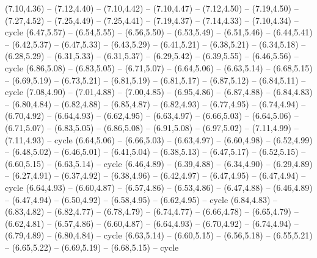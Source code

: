 \expandafter\def\csname geo:gebiet:SYR\endcsname{
  (7.10,4.36) -- (7.12,4.40) -- (7.10,4.42) -- (7.10,4.47) -- (7.12,4.50) -- (7.19,4.50) -- (7.27,4.52) -- (7.25,4.49) -- (7.25,4.41) -- (7.19,4.37) -- (7.14,4.33) -- (7.10,4.34) -- cycle}
\expandafter\def\csname geo:gebiet:ARM\endcsname{
  }
\expandafter\def\csname geo:gebiet:SWE\endcsname{
  (6.47,5.57) -- (6.54,5.55) -- (6.56,5.50) -- (6.53,5.49) -- (6.51,5.46) -- (6.44,5.41) -- (6.42,5.37) -- (6.47,5.33) -- (6.43,5.29) -- (6.41,5.21) -- (6.38,5.21) -- (6.34,5.18) -- (6.28,5.29) -- (6.31,5.33) -- (6.31,5.37) -- (6.29,5.42) -- (6.39,5.55) -- (6.46,5.56) -- cycle}
\expandafter\def\csname geo:gebiet:BLR\endcsname{
  (6.86,5.08) -- (6.83,5.05) -- (6.71,5.07) -- (6.64,5.06) -- (6.63,5.14) -- (6.68,5.15) -- (6.69,5.19) -- (6.73,5.21) -- (6.81,5.19) -- (6.81,5.17) -- (6.87,5.12) -- (6.84,5.11) -- cycle}
\expandafter\def\csname geo:gebiet:UKR\endcsname{
  (7.08,4.90) -- (7.01,4.88) -- (7.00,4.85) -- (6.95,4.86) -- (6.87,4.88) -- (6.84,4.83) -- (6.80,4.84) -- (6.82,4.88) -- (6.85,4.87) -- (6.82,4.93) -- (6.77,4.95) -- (6.74,4.94) -- (6.70,4.92) -- (6.64,4.93) -- (6.62,4.95) -- (6.63,4.97) -- (6.66,5.03) -- (6.64,5.06) -- (6.71,5.07) -- (6.83,5.05) -- (6.86,5.08) -- (6.91,5.08) -- (6.97,5.02) -- (7.11,4.99) -- (7.11,4.93) -- cycle}
\expandafter\def\csname geo:gebiet:POL\endcsname{
  (6.64,5.06) -- (6.66,5.03) -- (6.63,4.97) -- (6.60,4.98) -- (6.52,4.99) -- (6.48,5.02) -- (6.46,5.01) -- (6.41,5.04) -- (6.38,5.13) -- (6.47,5.17) -- (6.52,5.15) -- (6.60,5.15) -- (6.63,5.14) -- cycle}
\expandafter\def\csname geo:gebiet:AUT\endcsname{
  (6.46,4.89) -- (6.39,4.88) -- (6.34,4.90) -- (6.29,4.89) -- (6.27,4.91) -- (6.37,4.92) -- (6.38,4.96) -- (6.42,4.97) -- (6.47,4.95) -- (6.47,4.94) -- cycle}
\expandafter\def\csname geo:gebiet:HUN\endcsname{
  (6.64,4.93) -- (6.60,4.87) -- (6.57,4.86) -- (6.53,4.86) -- (6.47,4.88) -- (6.46,4.89) -- (6.47,4.94) -- (6.50,4.92) -- (6.58,4.95) -- (6.62,4.95) -- cycle}
\expandafter\def\csname geo:gebiet:MDA\endcsname{
  }
\expandafter\def\csname geo:gebiet:ROU\endcsname{
  (6.84,4.83) -- (6.83,4.82) -- (6.82,4.77) -- (6.78,4.79) -- (6.74,4.77) -- (6.66,4.78) -- (6.65,4.79) -- (6.62,4.81) -- (6.57,4.86) -- (6.60,4.87) -- (6.64,4.93) -- (6.70,4.92) -- (6.74,4.94) -- (6.79,4.89) -- (6.80,4.84) -- cycle}
\expandafter\def\csname geo:gebiet:LTU\endcsname{
  (6.63,5.14) -- (6.60,5.15) -- (6.56,5.18) -- (6.55,5.21) -- (6.65,5.22) -- (6.69,5.19) -- (6.68,5.15) -- cycle}
